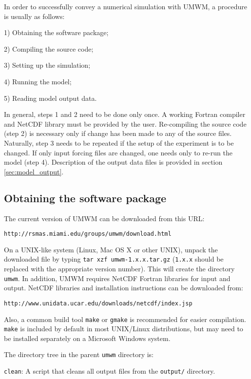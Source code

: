 \documentclass[letterpaper]{article}
\numberwithin{equation}{section}
\begin{document}
In order to successfully convey a numerical simulation with UMWM, 
a procedure is usually as follows:

1) Obtaining the software package;

2) Compiling the source code;

3) Setting up the simulation;

4) Running the model;

5) Reading model output data.

In general, steps 1 and 2 need to be done only once. 
A working Fortran compiler and NetCDF library must be provided by the user.
Re-compiling the source code (step 2) is necessary only 
if change has been made to any of the source files. 
Naturally, step 3 needs to be repeated if the setup of the experiment is to be changed.
If only input forcing files are changed, one needs only to re-run the model (step 4).
Description of the output data files is provided in section \ref{sec:model_output}.

\subsection{Obtaining the software package}

The current version of UMWM can be downloaded from this URL:

\begin{verbatim}
http://rsmas.miami.edu/groups/umwm/download.html
\end{verbatim}

On a UNIX-like system (Linux, Mac OS X or other UNIX), 
unpack the downloaded file by typing \verb+tar xzf umwm-1.x.x.tar.gz+
(\verb+1.x.x+ should be replaced with the appropriate version number).
This will create the directory \verb+umwm+.
In addition, UMWM requires NetCDF Fortran libraries for input and output.
NetCDF libraries and installation instructions can be downloaded from:

\begin{verbatim}
http://www.unidata.ucar.edu/downloads/netcdf/index.jsp
\end{verbatim}

Also, a common build tool \verb+make+ or \verb+gmake+ is recommended 
for easier compilation.
\verb+make+ is included by default in most UNIX/Linux distributions,
but may need to be installed separately on a Microsoft Windows system.

The directory tree in the parent \verb+umwm+ directory is:

\verb+clean+: A script that cleans all output files from the \verb+output/+ directory.
\end{document}
